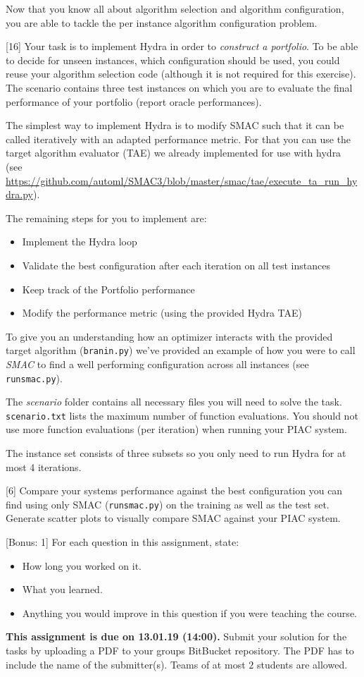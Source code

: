 \documentclass{exam}
\newcommand{\duedate}{13.01.19 (14:00)}
\newcommand{\due}{{\bf This assignment is due on \duedate.} }
\begin{document}
	\gccs
	Now that you know all about algorithm selection and algorithm configuration, you are able to tackle the per instance algorithm configuration problem.
	\begin{questions}
		[16]
		Your task is to implement Hydra in order to \textit{construct a portfolio}. To be able to decide for unseen instances, which configuration should be used,
		you could reuse your algorithm selection code (although it is not required for this exercise).
		The scenario contains three test instances on which you are to evaluate the final performance of your portfolio (report oracle performances).
		
		The simplest way to implement Hydra is to modify SMAC such that it can be called iteratively with an adapted performance metric. For that you can use
		the target algorithm evaluator (TAE) we already implemented for use with hydra (see \url{https://github.com/automl/SMAC3/blob/master/smac/tae/execute_ta_run_hydra.py}).
		
		The remaining steps for you to implement are:
		\begin{itemize}
			\item Implement the Hydra loop
			\item Validate the best configuration after each iteration on all test instances
			\item Keep track of the Portfolio performance
			\item Modify the performance metric (using the provided Hydra TAE)
		\end{itemize}
		
		To give you an understanding how an optimizer interacts with the provided target algorithm (\texttt{branin.py}) we've provided an example of how you
		were to call \textit{SMAC} to find a well performing configuration across all instances (see \texttt{runsmac.py}).
		
		The \textit{scenario} folder contains all necessary files you will need to solve the task. \texttt{scenario.txt} lists the maximum number of function evaluations.
		You should not use more function evaluations (per iteration) when running your PIAC system.
		
		The instance set consists of three subsets so you only need to run Hydra for at most 4 iterations.
		
		[6]
		Compare your systems performance against the best configuration you can find using only SMAC (\texttt{runsmac.py}) on the training as well as the test set.\\
		Generate scatter plots to visually compare SMAC against your PIAC system.
		
		[Bonus: 1]
		For each question in this assignment, state:
		\begin{itemize}
			\item How long you worked on it.
			\item What you learned.
			\item Anything you would improve in this question if you were teaching the course.
		\end{itemize}
		
	\end{questions}

\noindent
\due Submit your solution for the tasks by uploading a PDF to your groups BitBucket repository. The PDF has to include the name of the submitter(s). Teams of at most $2$ students are allowed.
\end{document}
